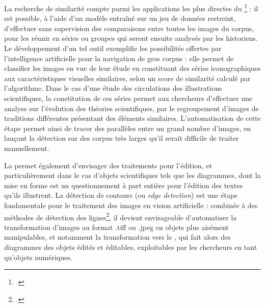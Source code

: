 	La recherche de similarité compte parmi les applications les plus directes du \dl\footcite{moiraghiExplorerCorpusImages2018} : il est possible, à l'aide d'un modèle entraîné sur un jeu de données restreint, d'effectuer sans supervision des comparaisons entre toutes les images du corpus, pour les réunir en séries ou groupes qui seront ensuite analysés par les historiens. Le développement d'un tel outil exemplifie les possibilités offertes par l'intelligence artificielle pour la navigation de gros corpus : elle permet de classifier les images en vue de leur étude en constituant des séries iconographiques aux caractéristiques visuelles similaires, selon un score de similarité calculé par l'algorithme. Dans le cas d'une étude des circulations des illustrations scientifiques, la constitution de ces séries permet aux chercheurs d'effectuer une analyse sur l'évolution des théories scientifiques, par le regroupement d'images de traditions différentes présentant des éléments similaires. L'automatisation de cette étape permet ainsi de tracer des parallèles entre un grand nombre d'images, en lançant la détection sur des corpus très larges qu'il serait difficile de traiter manuellement.
	
	La \cv permet également d'envisager des traitements pour l'édition, et particulièrement dans le cas d'objets scientifiques tels que les diagrammes, dont la mise en forme est un questionnement à part entière pour l'édition des textes qu'ils illustrent. La détection de contours (ou \textit{edge detection}) est une étape fondamentale pour le traitement des images en vision artificielle : combinée à des méthodes de détection des lignes\footcite{linComprehensiveReviewImage2023}, il devient envisageable d'automatiser la transformation d'images au format .tiff ou .jpeg en objets plus aisément manipulables, et notamment la transformation vers le \svg, qui fait alors des diagrammes des objets édités et éditables, exploitables par les chercheurs en tant qu'objets numériques.

